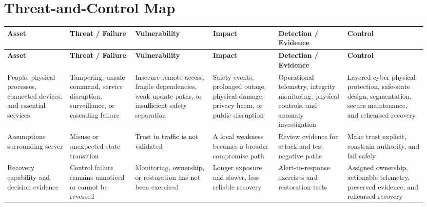 \documentclass[11pt]{article}
\begin{document}
\section*{Threat-and-Control Map}
\begingroup\scriptsize\setlength{\tabcolsep}{2pt}
\begin{longtable}{>{\RaggedRight\arraybackslash}p{}>{\RaggedRight\arraybackslash}p{}>{\RaggedRight\arraybackslash}p{}>{\RaggedRight\arraybackslash}p{}>{\RaggedRight\arraybackslash}p{}>{\RaggedRight\arraybackslash}p{}}
\toprule\rowcolor{Navy}\color{white}\textbf{Asset} & \color{white}\textbf{Threat / Failure} & \color{white}\textbf{Vulnerability} & \color{white}\textbf{Impact} & \color{white}\textbf{Detection / Evidence} & \color{white}\textbf{Control}\\\midrule
\endfirsthead
\toprule\rowcolor{Navy}\color{white}\textbf{Asset} & \color{white}\textbf{Threat / Failure} & \color{white}\textbf{Vulnerability} & \color{white}\textbf{Impact} & \color{white}\textbf{Detection / Evidence} & \color{white}\textbf{Control}\\\midrule
\endhead
People, physical processes, connected devices, and essential services & Tampering, unsafe command, service disruption, surveillance, or cascading failure & Insecure remote access, fragile dependencies, weak update paths, or insufficient safety separation & Safety events, prolonged outage, physical damage, privacy harm, or public disruption & Operational telemetry, integrity monitoring, physical controls, and anomaly investigation & Layered cyber-physical protection, safe-state design, segmentation, secure maintenance, and rehearsed recovery\\\midrule
Assumptions surrounding server & Misuse or unexpected state transition & Trust in traffic is not validated & A local weakness becomes a broader compromise path & Review evidence for attack and test negative paths & Make trust explicit, constrain authority, and fail safely\\\midrule
Recovery capability and decision evidence & Control failure remains unnoticed or cannot be reversed & Monitoring, ownership, or restoration has not been exercised & Longer exposure and slower, less reliable recovery & Alert-to-response exercises and restoration tests & Assigned ownership, actionable telemetry, preserved evidence, and rehearsed recovery\\\midrule
\bottomrule
\end{longtable}
\endgroup
\end{document}
